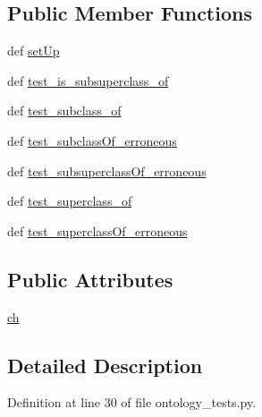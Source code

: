 \subsection*{Public Member Functions}
\begin{DoxyCompactItemize}
\item 
def \hyperlink{classontology__tests_1_1OntologyTests_afefdaef591afea533a0f3db805f461d6}{set\-Up}
\item 
def \hyperlink{classontology__tests_1_1OntologyTests_a65cd70206e2268477869f5c93a7ee987}{test\-\_\-is\-\_\-subsuperclass\-\_\-of}
\item 
def \hyperlink{classontology__tests_1_1OntologyTests_ad644ca030980df4855ef61ccd942414a}{test\-\_\-subclass\-\_\-of}
\item 
def \hyperlink{classontology__tests_1_1OntologyTests_aa86445a21148cdb5dfdeacc8898b7bf9}{test\-\_\-subclass\-Of\-\_\-erroneous}
\item 
def \hyperlink{classontology__tests_1_1OntologyTests_add05f64f73a81600af8d68689c3c9c2e}{test\-\_\-subsuperclass\-Of\-\_\-erroneous}
\item 
def \hyperlink{classontology__tests_1_1OntologyTests_a746a01c46535576607d0f52031c6b26e}{test\-\_\-superclass\-\_\-of}
\item 
def \hyperlink{classontology__tests_1_1OntologyTests_ab937e13d8966ae31a702b3392258d174}{test\-\_\-superclass\-Of\-\_\-erroneous}
\end{DoxyCompactItemize}
\subsection*{Public Attributes}
\begin{DoxyCompactItemize}
\item 
\hyperlink{classontology__tests_1_1OntologyTests_a7e3345ebe75dbde9a60f7fad1a0b6aa5}{ch}
\end{DoxyCompactItemize}


\subsection{Detailed Description}


Definition at line 30 of file ontology\-\_\-tests.\-py.



